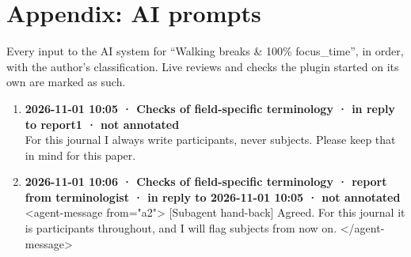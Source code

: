 \section*{Appendix: AI prompts}

Every input to the AI system for “Walking breaks \& 100\% focus\_time”, in order, with the author's classification. Live reviews and checks the plugin started on its own are marked as such.

\begin{enumerate}
  \item \textbf{2026-11-01 10:05 · Checks of field-specific terminology · in reply to report1 · not annotated} \\
  For this journal I always write participants, never subjects. Please keep that in mind for this paper.
  \item \textbf{2026-11-01 10:06 · Checks of field-specific terminology · report from terminologist · in reply to 2026-11-01 10:05 · not annotated} \\
  <agent-message from="a2"> [Subagent hand-back] Agreed. For this journal it is participants throughout, and I will flag subjects from now on. </agent-message>
\end{enumerate}
